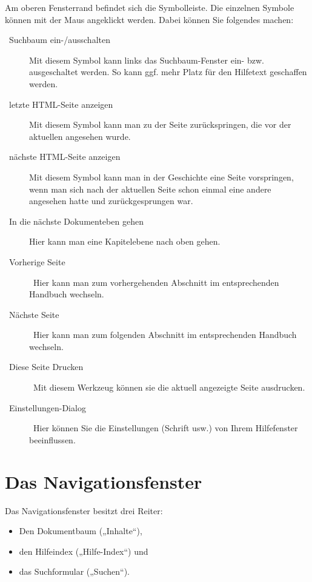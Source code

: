 {Am oberen Fensterrand befindet sich die Symbolleiste. Die einzelnen Symbole können mit der Maus angeklickt werden. Dabei können Sie folgendes machen:

\begin{description}
\item[~Suchbaum ein-/ausschalten] Mit diesem Symbol kann links das Suchbaum-Fenster ein- bzw. ausgeschaltet werden. So kann ggf. mehr Platz für den Hilfetext geschaffen werden.
\item[~letzte HTML-Seite anzeigen] Mit diesem Symbol kann man zu der Seite zurückspringen, die vor der aktuellen angesehen wurde.
\item[~nächste HTML-Seite anzeigen] Mit diesem Symbol kann man in der Geschichte eine Seite vorspringen, wenn man sich nach der aktuellen Seite schon einmal eine andere angesehen hatte und zurückgesprungen war.
\item[~In die nächste Dokumenteben gehen] Hier kann man eine Kapitelebene nach oben gehen.
\item[~Vorherige Seite]~Hier kann man zum vorhergehenden Abschnitt im entsprechenden Handbuch wechseln.
\item[~Nächste Seite]~Hier kann man zum folgenden Abschnitt im entsprechenden Handbuch wechseln.
\item[~Diese Seite Drucken]~Mit diesem Werkzeug können sie die aktuell angezeigte Seite ausdrucken.
\item[~Einstellungen-Dialog]~Hier können Sie die Einstellungen (Schrift usw.) von Ihrem Hilfefenster beeinflussen. 
\end{description}

\section{Das Navigationsfenster}
\label{sec:der-suchbaum}


Das Navigationsfenster besitzt drei Reiter:
\begin{itemize}
\item Den Dokumentbaum („Inhalte“),
\item den Hilfeindex („Hilfe-Index“) und
\item das Suchformular („Suchen“).
\end{itemize}

}
